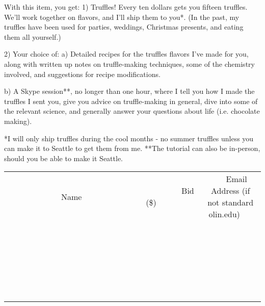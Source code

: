 \documentclass[11pt]{article}
\begin{document}
With this item, you get:
1) Truffles! Every ten dollars gets you fifteen truffles. We'll work together on flavors, and I'll ship them to you*. (In the past, my truffles have been used for parties, weddings, Christmas presents, and eating them all yourself.)

2) Your choice of:
    a) Detailed recipes for the truffles flavors I've made for you, along with written up notes on truffle-making techniques, some of the chemistry involved, and suggestions for recipe modifications.

    b) A Skype session**, no longer than one hour, where I tell you how I made the truffles I sent you, give you advice on truffle-making in general, dive into some of the relevant science, and generally answer your questions about life (i.e. chocolate making).

*I will only ship truffles during the cool months - no summer truffles unless you can make it to Seattle to get them from me.
**The tutorial can also be in-person, should you be able to make it Seattle.
\\[6ex]
\begin{tabular}{c c c}
~~~~~~~~~~~~~Name~~~~~~~~~~~~~ & ~~~~~~~~~Bid (\$)~~~~~~~~~  & ~~~Email Address (if not standard olin.edu)~~~\\
 & & \\
\hline
 & & \\
\hline
 & & \\
\hline
 & & \\
\hline
 & & \\
\hline
 & & \\
\hline
 & & \\
\hline
 & & \\
\hline
 & & \\
\hline
 & & \\
\hline
 & & \\
\hline
 & & \\
\hline
 & & \\
\hline
 & & \\
\hline
 & & \\
\hline
 & & \\
\hline
 & & \\
\hline
 & & \\
\hline
 & & \\
\hline
 & & \\
\hline
 & & \\
\hline
 & & \\
\hline
 & & \\
\hline
 & & \\
\hline
 & & \\
\hline
 & & \\
\hline
\end{tabular}
\newpage
\end{document}
